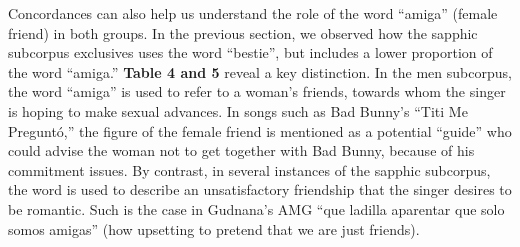 \documentclass[
  letterpaper,
  DIV=11,
  numbers=noendperiod]{scrartcl}
\begin{document}
Concordances can also help us understand the role of the word ``amiga''
(female friend) in both groups. In the previous section, we observed how
the sapphic subcorpus exclusives uses the word ``bestie'', but includes
a lower proportion of the word ``amiga.'' \textbf{Table 4 and 5} reveal
a key distinction. In the men subcorpus, the word ``amiga'' is used to
refer to a woman's friends, towards whom the singer is hoping to make
sexual advances. In songs such as Bad Bunny's ``Titi Me Preguntó,'' the
figure of the female friend is mentioned as a potential ``guide'' who
could advise the woman not to get together with Bad Bunny, because of
his commitment issues. By contrast, in several instances of the sapphic
subcorpus, the word is used to describe an unsatisfactory friendship
that the singer desires to be romantic. Such is the case in Gudnana's
AMG ``que ladilla aparentar que solo somos amigas'' (how upsetting to
pretend that we are just friends).
\end{document}
